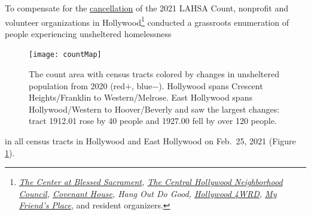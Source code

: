 \documentclass[11pt]{article}
\begin{document}

 To compensate for the \href{https://laist.com/latest/post/20201209/LAHSA-cancels-2021-homeless-count-los-angeles-covid-19}
{cancellation} of the 2021 LAHSA Count, nonprofit and volunteer organizations in Hollywood\footnote{
{\it \href{https://thecenterinhollywood.org}
{The Center at Blessed Sacrament}, \href{https://chnc.org}{The Central Hollywood Neighborhood Council}, 
\href{https://www.covenanthouse.org/spring-meal-match?sourceid=2483460&origin=DHQEI2109EZI0N&utm_source=2103marchmealmatchweb&utm_medium=cpc&utm_campaign=FY21MarchMealMatch&utm_content=bsd2103marchmealmatchweb&gclid=CjwKCAiAp4KCBhB6EiwAxRxbpJA2yM7lM2tyAqjVALZgBGvjnhobCJJ0XmuELFDXzM5xxZ0BqyX1ChoCLi0QAvD_BwE}{Covenant House}, 
Hang Out Do Good, \href{https://hollywood4wrd.live}{Hollywood 4WRD}, 
 \href{https://www.myfriendsplace.org/}{My Friend's Place}}, and resident organizers.} conducted a
grassroots enumeration of people experiencing unsheltered homelessness%
\begin{figure}
	\centering
	\texttt{[image: countMap]}
	\caption{The count area with census tracts colored by  
			changes in unsheltered population from 2020 (red$+$, blue$-$).
			Hollywood spans Crescent Heights/Franklin to Western/Melrose. East Hollywood 
			spans Hollywood/Western to Hoover/Beverly and saw the largest changes:
			tract 1912.01 rose by 40 people and 1927.00 fell by over 120 people.}
	\label{fig:tcomp}
\end{figure} in all
census tracts in Hollywood and East Hollywood on Feb.~25, 2021 (Figure \ref{fig:tcomp}).\\

%
\end{document}
